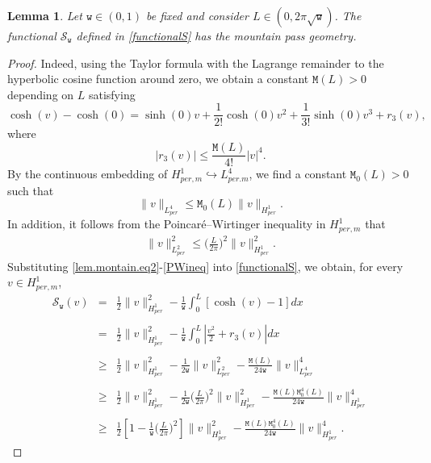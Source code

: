 \documentclass[12pt,reqno,a4paper]{amsart} %
\numberwithin{equation}{section}
\numberwithin{figure}{section}
\newtheorem{lemma}[theorem]{Lemma}
\begin{document}
 \begin{lemma}\label{lem.montain}
Let $\mathtt{w}\in(0,1)$ be fixed and  consider  $L\in(0,2\pi \sqrt{\mathtt{w}})$. The functional $\mathcal{S}_\mathtt{w}$ defined in \eqref{functionalS} has the mountain pass geometry. 
 \end{lemma}
 \begin{proof}
 	Indeed, using the Taylor formula with the Lagrange remainder to the hyperbolic cosine function around zero, we obtain a constant $\mathtt{M}(L)>0$ depending on $L$ satisfying %
 	\begin{equation}\label{lem.montain.eq2}
 		\cosh(v)-\cosh(0)=\sinh(0) v+\frac{1}{2!} \cosh(0)v^2+\frac{1}{3!}\sinh(0)v^3+r_3(v),
 	\end{equation}where 
 	\begin{equation}\label{lem.montain.eq2'}
 		|r_3(v)|\leq \frac{\mathtt{M}(L)}{4!}|v|^4. 
 	\end{equation}
 	By the continuous embedding of $H^1_{per,m}\hookrightarrow L^4_{per.m}$, we find a constant $\mathtt{M}_0(L)>0$ such that 
 	\begin{equation}\label{lem.montain.eq3}
 		\|v\|_{L^4_{per}}\leq\mathtt{M}_0(L)  	\|v\|_{H^1_{per}}. 
 	\end{equation}  	 	
 	In addition, it follows from the Poincaré–Wirtinger inequality in $H_{per,m}^1$ that
 	\begin{align}  \label{PWineq}
 		\|v\|^2_{L^2_{per}}\leq 	 \biggl(\frac{L}{2\pi}\biggl)^2\|v\|^2_{H^1_{per}}.
 	\end{align} 
 	Substituting \eqref{lem.montain.eq2}-\eqref{PWineq} into \eqref{functionalS}, we obtain, for every $v\in H^1_{per,m}$,
 	\begin{equation}\label{lem.montain.eq4}\begin{array}{llllllll}
 		\mathcal{S}_\mathtt{w}(v)&=&\displaystyle \frac{1}{2} \|v\|^2_{H^1_{per}} -\frac{1}{\mathtt{w}}\int_{0}^{L} [\cosh(v) -1] dx  \\\\ &= & \displaystyle \frac{1}{2} \|v\|^2_{H^1_{per}} -\frac{1}{\mathtt{w}}\int_{0}^{L} \left|\frac{v^2}{2}+r_3(v)\right| dx \\\\ 
 		&\ge &\displaystyle  \frac{1}{2} \|v\|^2_{H^1_{per}} -\frac{1}{2\mathtt{w}}\|v\|^2_{L^2_{per}}  - \frac{\mathtt{M}(L)}{24\mathtt{w}}\|v\|^4_{L^4_{per}} \\\\&\ge &\displaystyle  \frac{1}{2} \|v\|^2_{H^1_{per}} -\frac{1}{2\mathtt{w}}	 \biggl(\frac{L}{2\pi}\biggl)^2\|v\|^2_{H^1_{per}}  - \frac{\mathtt{M}(L)\mathtt{M}_0^4(L)}{24\mathtt{w}}\|v\|^4_{H^1_{per}} \\\\&\ge & \displaystyle \frac{1}{2}\left[1 - \frac{1}{\mathtt{w}}\biggl(\frac{L}{2\pi}\biggl)^2	 \right]\|v\|^2_{H^1_{per}}  - \frac{\mathtt{M}(L)\mathtt{M}_0^4(L)}{24\mathtt{w}}\|v\|^4_{H^1_{per}}.

\end{array}
\end{equation}
\end{proof}
\end{document}
